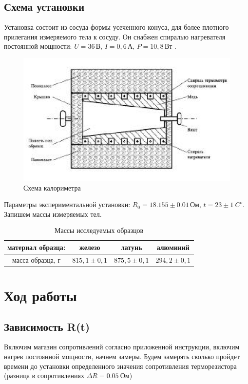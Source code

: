 \documentclass[a4paper, 12pt]{article}%
\begin{document}
	\subsection{Схема установки}
	Установка состоит из сосуда формы усеченного конуса, для более плотного прилегания измеряемого тела к сосуду. Он снабжен спиралью нагревателя постоянной мощности: $ U = 36 \, \text{В}, \, I = 0,6 \, \text{А}, \, P = 10,8 \, \text{Вт} $ . \\
	\begin{figure}[H]
		\centering
		\includegraphics[width=0.6\linewidth]{"Снимок экрана 2022-03-30 222759"}
		\caption{Схема калориметра}
	\end{figure}
	Параметры экспериментальной установки: $ R_{0} = 18.155 \pm 0.01 \, \text{Ом}, \, t = 23 \pm 1~ C^{o}$. Запишем массы измеряемых тел.
	\begin{table}[H]
		\centering
		\begin{tabular}{|c|c|c|c|}
			\hline
			материал образца: & железо          & латунь          & алюминий        \\ \hline
			масса образца, г  & $815,1 \pm 0,1$ & $875,5 \pm 0,1$ & $294,2 \pm 0,1$ \\ \hline
		\end{tabular}
		\caption{Массы исследуемых образцов}

	\end{table}
	\section{Ход работы}
	\subsection{Зависимость R(t)}
	Включим магазин сопротивлений согласно приложенной инструкции, включим нагрев постоянной мощности, начнем замеры. Будем замерять сколько пройдет времени до установки определенного значения сопротивления терморезистора (разница в сопротивлениях $\Delta R = 0.05 ~ Ом$)
	
\end{document}
